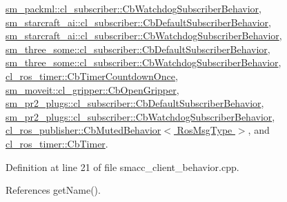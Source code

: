 \hyperlink{classsm__packml_1_1cl__subscriber_1_1CbWatchdogSubscriberBehavior_a5c56f89cfc61f0db7f44a2037ff215f6}{sm\+\_\+packml\+::cl\+\_\+subscriber\+::\+Cb\+Watchdog\+Subscriber\+Behavior}, \hyperlink{classsm__starcraft__ai_1_1cl__subscriber_1_1CbDefaultSubscriberBehavior_af8cd24389471af7133f258839f899932}{sm\+\_\+starcraft\+\_\+ai\+::cl\+\_\+subscriber\+::\+Cb\+Default\+Subscriber\+Behavior}, \hyperlink{classsm__starcraft__ai_1_1cl__subscriber_1_1CbWatchdogSubscriberBehavior_a74aa8ecc420589bda47b90877bc120a7}{sm\+\_\+starcraft\+\_\+ai\+::cl\+\_\+subscriber\+::\+Cb\+Watchdog\+Subscriber\+Behavior}, \hyperlink{classsm__three__some_1_1cl__subscriber_1_1CbDefaultSubscriberBehavior_a9d1f8dfb490a26b1fcdab1b740436837}{sm\+\_\+three\+\_\+some\+::cl\+\_\+subscriber\+::\+Cb\+Default\+Subscriber\+Behavior}, \hyperlink{classsm__three__some_1_1cl__subscriber_1_1CbWatchdogSubscriberBehavior_a6bd938abf54a95555182345a5e53cafe}{sm\+\_\+three\+\_\+some\+::cl\+\_\+subscriber\+::\+Cb\+Watchdog\+Subscriber\+Behavior}, \hyperlink{classcl__ros__timer_1_1CbTimerCountdownOnce_a613662c4a4106ece0ce1dee198d1aba2}{cl\+\_\+ros\+\_\+timer\+::\+Cb\+Timer\+Countdown\+Once}, \hyperlink{classsm__moveit_1_1cl__gripper_1_1CbOpenGripper_af601f6a5e2a280927a64b48100826b28}{sm\+\_\+moveit\+::cl\+\_\+gripper\+::\+Cb\+Open\+Gripper}, \hyperlink{classsm__pr2__plugs_1_1cl__subscriber_1_1CbDefaultSubscriberBehavior_ab4ac6d3ff4d7d919c12c35ce18c48990}{sm\+\_\+pr2\+\_\+plugs\+::cl\+\_\+subscriber\+::\+Cb\+Default\+Subscriber\+Behavior}, \hyperlink{classsm__pr2__plugs_1_1cl__subscriber_1_1CbWatchdogSubscriberBehavior_a15796d4cae539489a23fc0e444074158}{sm\+\_\+pr2\+\_\+plugs\+::cl\+\_\+subscriber\+::\+Cb\+Watchdog\+Subscriber\+Behavior}, \hyperlink{classcl__ros__publisher_1_1CbMutedBehavior_a79376d9160e3bd44678a2c0d89f1b4de}{cl\+\_\+ros\+\_\+publisher\+::\+Cb\+Muted\+Behavior$<$ Ros\+Msg\+Type $>$}, and \hyperlink{classcl__ros__timer_1_1CbTimer_aceba45e86271cf1b7333e2f42c246a38}{cl\+\_\+ros\+\_\+timer\+::\+Cb\+Timer}.



Definition at line 21 of file smacc\+\_\+client\+\_\+behavior.\+cpp.



References get\+Name().


